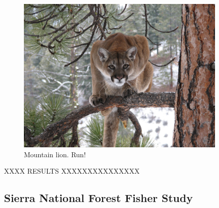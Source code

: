 \begin{figure}
\centering
\includegraphics[height=3in]{Ch15-searchencounter/figs/mountain_lion.jpg}
\caption{
Mountain lion.
Run!
}
\label{searchencounter.fig.lion}
\end{figure}

XXXX RESULTS XXXXXXXXXXXXXXX

\subsection{Sierra National Forest Fisher Study}

